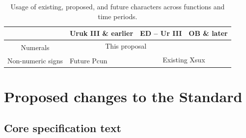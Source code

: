 \documentclass[10pt, a4paper, twoside]{article}
\begin{document}
\begin{table}[htbp]
\begin{center}
\begin{tabular}{ l | l | l | l |} \cline{2-4}
                                                & Uruk III \& earlier & ED – Ur III                         & OB \& later    \\\hline
\multicolumn{1}{|c|}{\multirow{2}{*}{Numerals}} & \multicolumn{2}{|c|}{This proposal}                       &                \\\cline{2-4}
\multicolumn{1}{|c|}{}                          &                     & \multicolumn{2}{|c|}{\multirow{2}{*}{Existing Xsux}} \\\cline{1-2}
\multicolumn{1}{|c|}{Non-numeric signs}         & Future Pcun         & \multicolumn{2}{|c|}{}                               \\\hline
\end{tabular}
\caption{Usage of existing, proposed, and future characters across functions and time periods.}
\end{center}
\label{tableUnificationsDisunifications}
\end{table}

\section{Proposed changes to the Standard}
\label{proposal}
\subsection{Core specification text}
\end{document}
